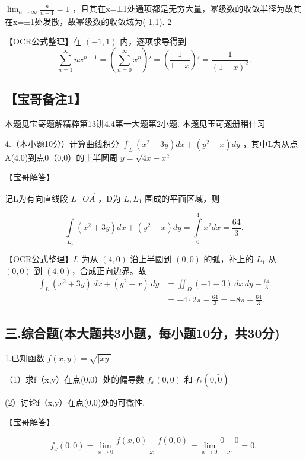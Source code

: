 \documentclass[11pt,fontset=fandol]{ctexart}
\begin{document}
\(\lim _ { n \to \infty } { \frac { n } { n + 1 } } = 1\)
，且其在x=±1处通项都是无穷大量，幂级数的收敛半径为故其在x=±1处发散，故幂级数的收敛域为(-1,1).
2

【OCR公式整理】在 \((-1,1)\) 内，逐项求导得到 \[
\sum_{n=1}^\infty nx^{n-1}
=\left(\sum_{n=0}^\infty x^n\right)'
=\left(\frac1{1-x}\right)'=\frac1{(1-x)^2}.
\]

\subsection{【宝哥备注1】}\label{ux5b9dux54e5ux5907ux6ce81}

本题见宝哥题解精粹第13讲4.4第一大题第2小题. 本题见玉可题册稍什习

4.（本小题10分）计算曲线积分
\(\int _ { L } ( x ^ { 2 } + 3 y ) d x + ( y ^ { 2 } - x ) d y\)
，其中L为从点A(4,0)到点0（0,0）的上半圆周
\(y = \sqrt { 4 x - x ^ { 2 } }\)

【宝哥解答】

记L为有向直线段 \(L _ { 1 }\) \(\overrightarrow { O A }\) ，D为
\(L , L _ { 1 }\) 围成的平面区域，则

\[
\int \limits _ { L _ { 1 } } ( x ^ { 2 } + 3 y ) d x + ( y ^ { 2 } - x ) d y = \int \limits _ { 0 } ^ { 4 } x ^ { 2 } d x = \frac { 6 4 } { 3 } .
\]

【OCR公式整理】\(L\) 为从 \((4,0)\) 沿上半圆到 \((0,0)\) 的弧，补上的
\(L_1\) 从 \((0,0)\) 到 \((4,0)\)，合成正向边界。故 \[
\begin{aligned}
\int_L(x^2+3y)\,dx+(y^2-x)\,dy
&=\iint_D(-1-3)\,dx\,dy-\frac{64}{3}\\
&=-4\cdot2\pi-\frac{64}{3}
=-8\pi-\frac{64}{3}.
\end{aligned}
\]

\subsection{三.综合题(本大题共3小题，每小题10分，共30分)}\label{ux4e09.ux7efcux5408ux9898ux672cux5927ux9898ux51713ux5c0fux9898ux6bcfux5c0fux989810ux5206ux517130ux5206}

1.已知函数 \(f ( x , y ) = { \sqrt { \left| x y \right| } }\)

（1）求f（x,y）在点(0,0）处的偏导数 \(f _ { x } ( 0 , 0 )\) 和
\(f _ { \ast } ( 0 , \widetilde { 0 } )\)

(2）讨论f（x,y）在点(0,0)处的可微性.

【宝哥解答】

\[
f _ { x } ( 0 , 0 ) = \lim _ { x \to 0 } { \frac { f ( x , 0 ) - f ( 0 , 0 ) } { x } } = \lim _ { x \to 0 } { \frac { 0 - 0 } { x } } = 0 ,
\]
\end{document}
